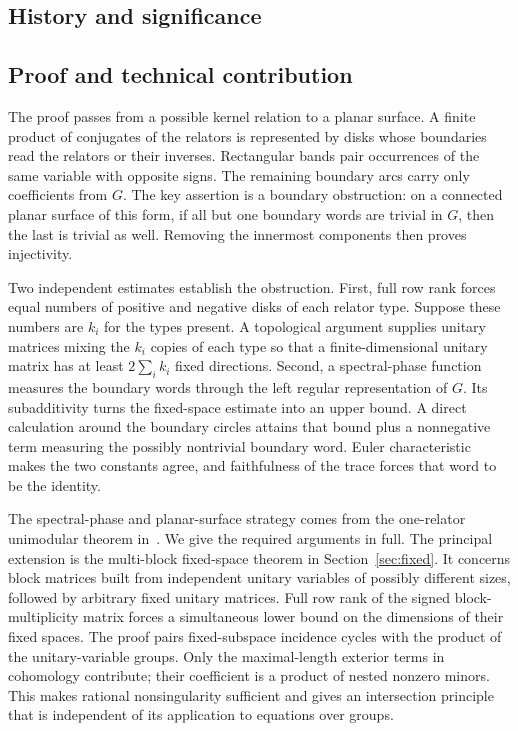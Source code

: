 \subsection{History and significance}


\subsection{Proof and technical contribution}

The proof passes from a possible kernel relation to a planar surface.
A finite product of conjugates of the relators is represented by disks
whose boundaries read the relators or their inverses. Rectangular bands
pair occurrences of the same variable with opposite signs. The remaining
boundary arcs carry only coefficients from $G$. The key assertion is a
boundary obstruction: on a connected planar surface of this form, if all
but one boundary words are trivial in $G$, then the last is trivial as
well. Removing the innermost components then proves injectivity.

Two independent estimates establish the obstruction. First, full row rank
forces equal numbers of positive and negative disks of each relator type.
Suppose these numbers are $k_i$ for the types present. A topological
argument supplies unitary matrices mixing the $k_i$ copies of each type
so that a finite-dimensional unitary matrix has at least $2\sum_i k_i$ fixed
directions. Second, a spectral-phase function measures the boundary words
through the left regular representation of $G$. Its subadditivity turns
the fixed-space estimate into an upper bound. A direct calculation around
the boundary circles attains that bound plus a nonnegative term measuring
the possibly nontrivial boundary word. Euler characteristic makes the
two constants agree, and faithfulness of the trace forces that word to
be the identity.

The spectral-phase and planar-surface strategy comes from the
one-relator unimodular theorem in~\cite{OpenAIKervaire2026}. We give
the required arguments in full. The principal extension is the
multi-block fixed-space theorem in Section~\ref{sec:fixed}. It concerns
block matrices built from independent unitary variables of possibly
different sizes, followed by arbitrary fixed unitary matrices. Full row
rank of the signed block-multiplicity matrix forces a simultaneous lower
bound on the dimensions of their fixed spaces. The proof pairs
fixed-subspace incidence cycles with the product of the unitary-variable
groups. Only the maximal-length exterior terms in cohomology contribute;
their coefficient is a product of nested nonzero minors. This makes
rational nonsingularity sufficient and gives an intersection principle
that is independent of its application to equations over groups.


